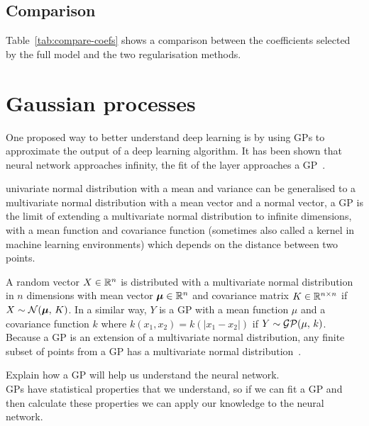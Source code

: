 
\subsection{Comparison}

Table~\ref{tab:compare-coefs} shows a comparison between the coefficients selected by the full model and the two regularisation methods.


\section{Gaussian processes}

One proposed way to better understand deep learning is by using \acp{GP} to approximate the output of a deep learning algorithm.
It has been shown that  neural network approaches infinity, the fit of the layer approaches a \ac{GP}~\autocite{neal1996}.

 univariate normal distribution with a mean and variance can be generalised to a multivariate normal distribution with a mean vector and a normal vector, a \ac{GP} is the limit of extending a multivariate normal distribution to infinite dimensions, with a mean function and covariance function (sometimes also called a kernel in machine learning environments) which depends on the distance between two points.

A random vector \(X \in \mathbb{R}{}^n\) is distributed with a multivariate normal distribution in \(n\) dimensions with mean vector \(\bm{\mu} \in \mathbb{R}{}^n\) and covariance matrix \(K \in \mathbb{R}^{n \times n}\) if \(X \sim \mathcal{N}(\bm{\mu},\, K)\).
In a similar way, \(Y\) is a \ac{GP} with a mean function \(\mu\) and a covariance function \(k\) where \(k(x_1, x_2) = k(\left|x_1 - x_2\right|)\) if \(Y \sim \mathcal{GP}(\mu,\, k)\).
Because a \ac{GP} is an extension of a multivariate normal distribution, any finite subset of points from a \ac{GP} has a multivariate normal distribution~\autocite[515]{williams1996}.

\begin{todo}
	Explain how a GP will help us understand the neural network. \\
	GPs have statistical properties that we understand, so if we can fit a GP and then calculate these properties we can apply our knowledge to the neural network.
\end{todo}

